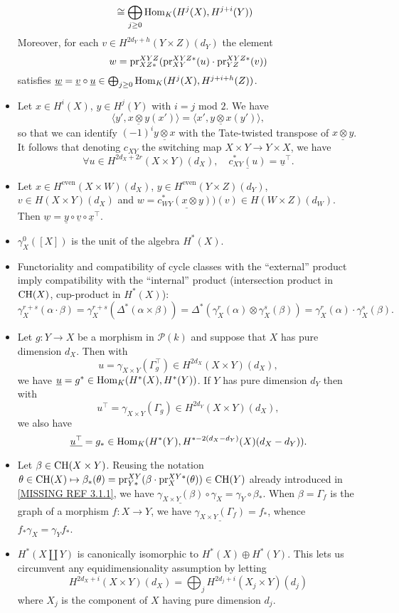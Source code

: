 \documentclass[../main.tex]{subfiles}
\begin{document}
\begin{itemize}
\begin{align*}
        &\cong \bigoplus_{j \geq 0} \operatorname{Hom}_K(H^j(X), H^{j+i}(Y))
    \end{align*}
    Moreover, for each $v \in H^{2d_Y + h}(Y \times Z)(d_Y)$ the element
    $$w = \mathrm{pr}^{XYZ}_{XZ*}(\mathrm{pr}^{XYZ*}_{XY}(u) \cdot \mathrm{pr}^{XYZ*}_{YZ}(v))$$
    satisfies $\underline{w} = \underline{v} \circ \underline{u} \in \bigoplus_{j \geq 0} \operatorname{Hom}_K(H^j(X), H^{j+i+h}(Z))$.
    \item Let $x \in H^i(X)$, $y \in H^j(Y)$ with $i = j$ mod $2$. We have
    $$\langle y', \underline{x \otimes y}(x')\rangle = \langle x', \underline{y \otimes x}(y')\rangle,$$
    so that we can identify $(-1)^i \underline{y \otimes x}$ with the Tate-twisted transpose of $\underline{x \otimes y}$.
    It follows that denoting $c_{XY}$ the switching map $X \times Y \to Y \times X$, we have
    $$\forall u \in H^{2d_X + 2r}(X \times Y)(d_X),\quad \underline{c_{XY}^*(u)} = \underline{u}^{\top}.$$
    \item Let $x \in H^{\text{even}}(X \times W)(d_X)$, $y \in H^{\text{even}}(Y \times Z)(d_Y)$, $v \in H(X \times Y)(d_X)$ and $w = \underline{c_{WY}^*(x \otimes y))}(v) \in H(W \times Z)(d_W)$. Then $\underline{w} = \underline{y} \circ \underline{v} \circ \underline{x}^{\top}$.
    \item $\gamma_X^0([X])$ is the unit of the algebra $H^*(X)$.
    \item Functoriality and compatibility of cycle classes with the \enquote{external} product imply compatibility with the \enquote{internal} product (intersection product in $\operatorname{CH}(X)$, cup-product in $H^*(X)$):
    $$\gamma_X^{r+s}(\alpha \cdot \beta) = \gamma_X^{r+s}(\Delta^*(\alpha \times \beta)) = \Delta^*(\gamma_X^r(\alpha) \otimes \gamma_X^s(\beta)) = \gamma_X^r(\alpha) \cdot \gamma_X^s(\beta).$$
    \item Let $g : Y \to X$ be a morphism in $\mathcal{P}(k)$ and suppose that $X$ has pure dimension $d_X$.
    Then with
    $$u = \gamma_{X \times Y}(\Gamma_g^{\top}) \in H^{2d_X}(X \times Y)(d_X),$$
    we have $\underline{u} = g^* \in \operatorname{Hom}_K(H^*(X), H^*(Y))$.
    If $Y$ has pure dimension $d_Y$ then with
    $$u^{\top} = \gamma_{X \times Y}(\Gamma_g) \in H^{2d_Y}(X \times Y)(d_X),$$
    we also have
    $$\underline{u^{\top}} = g_* \in \operatorname{Hom}_K(H^*(Y), H^{* - 2(d_X - d_Y)}(X)(d_X - d_Y)).$$
    \item Let $\beta \in \operatorname{CH}(X \times Y)$.
    Reusing the notation $\theta \in \operatorname{CH}(X) \mapsto \beta_*(\theta) = \mathrm{pr}^{XY}_{Y*}(\beta \cdot \mathrm{pr}^{XY*}_X(\theta)) \in \operatorname{CH}(Y)$ already introduced in \ref{MISSING REF 3.1.1}, we have $\underline{\gamma_{X \times Y}(\beta)} \circ \gamma_X = \gamma_Y \circ \beta_*$.
    When $\beta = \Gamma_f$ is the graph of a morphism $f : X \to Y$, we have $\underline{\gamma_{X \times Y}(\Gamma_f)} = f_*$, whence $f_*\gamma_X = \gamma_Y f_*$.
    \item $H^*(X \amalg Y)$ is canonically isomorphic to $H^*(X) \oplus H^*(Y)$.
    This lets us circumvent any equidimensionality assumption by letting
    $$H^{2d_X + i}(X \times Y)(d_X) = \bigoplus_j H^{2d_j + i} (X_j \times Y)(d_j)$$
    where $X_j$ is the component of $X$ having pure dimension $d_j$.
\end{itemize}
\end{document}
